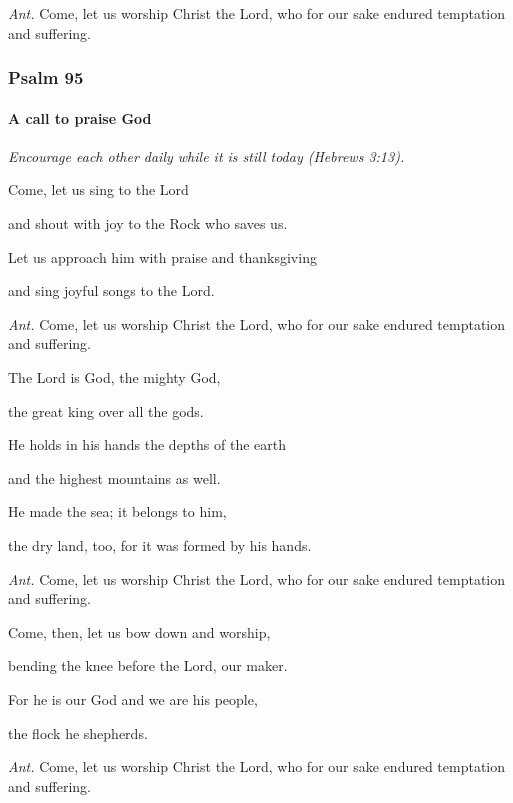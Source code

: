 \emph{Ant.} Come, let us worship Christ the Lord, who for our sake endured temptation and suffering.

\subsubsection{Psalm 95}	\paragraph{A call to praise God}




\vspace{5pt}
\emph{Encourage each other daily while it is still today (Hebrews 3:13).}
\vspace{5pt}

Come, let us sing to the Lord 

 \noindent  and shout with joy to the Rock who saves us.

\noindent Let us approach him with praise and thanksgiving 

\noindent   and sing joyful songs to the Lord.

\vspace{5pt}
\emph{Ant.} Come, let us worship Christ the Lord, who for our sake endured temptation and suffering.
\vspace{5pt}

The Lord is God, the mighty God, 

\noindent   the great king over all the gods.

\noindent He holds in his hands the depths of the earth 

\noindent   and the highest mountains as well.

\noindent He made the sea; it belongs to him, 

\noindent   the dry land, too, for it was formed by his hands.

\vspace{5pt}
\emph{Ant.} Come, let us worship Christ the Lord, who for our sake endured temptation and suffering.
\vspace{5pt}

Come, then, let us bow down and worship, 

\noindent   bending the knee before the Lord, our maker.

\noindent For he is our God and we are his people, 

\noindent   the flock he shepherds.

\vspace{5pt}
\emph{Ant.} Come, let us worship Christ the Lord, who for our sake endured temptation and suffering.
\vspace{5pt}

